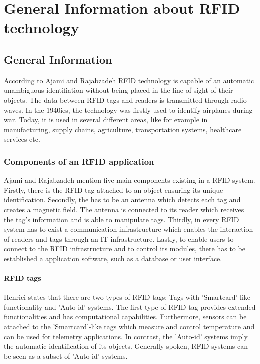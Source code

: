 
\chapter{General Information about RFID technology}
\label{Kap2}

\section{General Information}

According to Ajami and Rajabzadeh \cite{ncbi} RFID technology is capable of an automatic unambiguous identifiation without being placed in the line of sight of their objects. The data between RFID tags and readers is transmitted through radio waves. In the 1940ies, the technology was firstly used to identify airplanes during war. Today, it is used in several different areas, like for example in manufacturing, supply chains, agriculture, transportation systems, healthcare services etc. 

\subsection{Components of an RFID application}

Ajami and Rajabzadeh \cite{ncbi} mention five main components existing in a RFID system. Firstly, there is the RFID tag attached to an object ensuring its unique identification. Secondly, the has to be an antenna which detects each tag and creates a magnetic field. The antenna is connected to its reader which receives the tag's information and is able to manipulate tags. Thirdly, in every RFID system has to exist a communication infrastructure which enables the interaction of readers and tags through an \ac{IT} infrastructure. Lastly, to enable users to connect to the RFID infrastructure and to control its modules, there has to be established a application software, such as a database or user interface.

\subsubsection{RFID tags} \label{tags}

Henrici \cite{henrici} states that there are two types of RFID tags: Tags with 'Smartcard'-like functionality and 'Auto-id' systems. The first type of RFID tag  provides extended functionalities and has computational capabilities. Furthermore, sensors can be attached to the 'Smartcard'-like tags which measure and control temperature and can be used for telemetry applications. In contrast, the 'Auto-id' systems imply the automatic identification of its objects. Generally spoken, RFID systems can be seen as a subset of 'Auto-id' systems.

